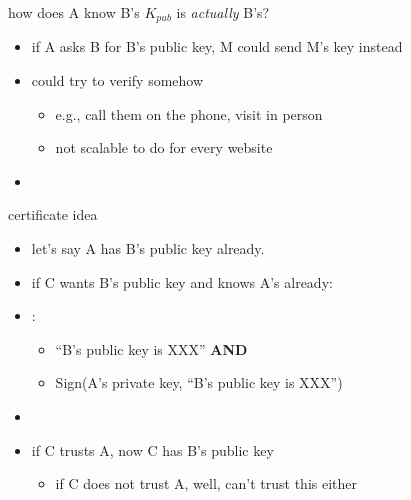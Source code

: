\begin{frame}{how does A know B's $K_{pub}$ is \textit{actually} B's?}
    \begin{itemize}
    \item if A asks B for B's public key, M could send M's key instead
    \vspace{0.5em}
    \item could try to verify somehow
        \begin{itemize}
        \item e.g., call them on the phone, visit in person
        \item not scalable to do for every website
        \end{itemize}
    \vspace{0.5em}
    \item<2> 
    \end{itemize}
\end{frame}



\begin{frame}{certificate idea}
    \begin{itemize}
        \item let's say A has B's public key already.
        \item if C wants B's public key and knows A's already:
            \vspace{.5cm}
        \item {}:
            \begin{itemize}
            \item ``B's public key is XXX'' \textbf{AND}
            \item Sign(A's private key, ``B's public key is XXX'')
            \end{itemize}
        \item {}
        \item if C trusts A, now C has B's public key
            \begin{itemize}
            \item if C does not trust A, well, can't trust this either
            \end{itemize}
    \end{itemize}
\end{frame}

